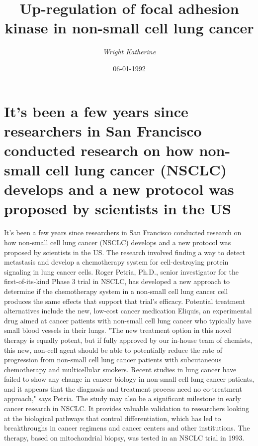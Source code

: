 \documentclass{article}%
\title{Up{-}regulation of focal adhesion kinase in non{-}small cell lung cancer}%
\author{\textit{Wright Katherine}}%
\date{06-01-1992}%
\begin{document}
%
\normalsize%
\maketitle%
\section{It's been a few years since researchers in San Francisco conducted research on how non{-}small cell lung cancer (NSCLC) develops and a new protocol was proposed by scientists in the US}%
\label{sec:ItsbeenafewyearssinceresearchersinSanFranciscoconductedresearchonhownon{-}smallcelllungcancer(NSCLC)developsandanewprotocolwasproposedbyscientistsintheUS}%
It's been a few years since researchers in San Francisco conducted research on how non{-}small cell lung cancer (NSCLC) develops and a new protocol was proposed by scientists in the US. The research involved finding a way to detect metastasis and develop a chemotherapy system for cell{-}destroying protein signaling in lung cancer cells.\newline%
Roger Petria, Ph.D., senior investigator for the first{-}of{-}its{-}kind Phase 3 trial in NSCLC, has developed a new approach to determine if the chemotherapy system in a non{-}small cell lung cancer cell produces the same effects that support that trial's efficacy.\newline%
Potential treatment alternatives include the new, low{-}cost cancer medication Eliquis, an experimental drug aimed at cancer patients with non{-}small cell lung cancer who typically have small blood vessels in their lungs.\newline%
"The new treatment option in this novel therapy is equally potent, but if fully approved by our in{-}house team of chemists, this new, non{-}cell agent should be able to potentially reduce the rate of progression from non{-}small cell lung cancer patients with subcutaneous chemotherapy and multicellular smokers. Recent studies in lung cancer have failed to show any change in cancer biology in non{-}small cell lung cancer patients, and it appears that the diagnosis and treatment process need no co{-}treatment approach," says Petria.\newline%
The study may also be a significant milestone in early cancer research in NSCLC. It provides valuable validation to researchers looking at the biological pathways that control differentiation, which has led to breakthroughs in cancer regimens and cancer centers and other institutions. The therapy, based on mitochondrial biopsy, was tested in an NSCLC trial in 1993.\newline%
\end{document}
